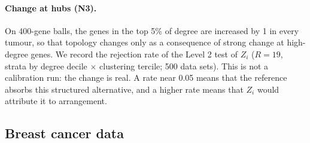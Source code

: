 \paragraph{Change at hubs (N3).} On 400-gene balls, the genes in the top 5\% of degree are increased by 1 in every tumour, so that topology changes only as a consequence of strong change at high-degree genes. We record the rejection rate of the Level 2 test of $Z_i$ ($R=19$, strata by degree decile $\times$ clustering tercile; 500 data sets). This is not a calibration run: the change is real. A rate near 0.05 means that the reference absorbs this structured alternative, and a higher rate means that $Z_i$ would attribute it to arrangement.

\subsection{Breast cancer data}\label{sec:cohort}
